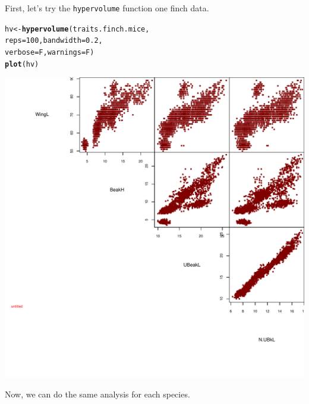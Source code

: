 \documentclass[12pt]{article}\usepackage[]{graphicx}\usepackage[]{color}
\makeatletter
\def\maxwidth{ %
  \ifdim\Gin@nat@width>\linewidth
    \linewidth
  \else
    \Gin@nat@width
  \fi
}
\newcommand{\hlnum}[1]{\textcolor[rgb]{0.686,0.059,0.569}{#1}}%
\newcommand{\hlstd}[1]{\textcolor[rgb]{0.345,0.345,0.345}{#1}}%
\newcommand{\hlkwb}[1]{\textcolor[rgb]{0.69,0.353,0.396}{#1}}%
\newcommand{\hlkwc}[1]{\textcolor[rgb]{0.333,0.667,0.333}{#1}}%
\newcommand{\hlkwd}[1]{\textcolor[rgb]{0.737,0.353,0.396}{\textbf{#1}}}%
\newenvironment{kframe}{%
 \def\at@end@of@kframe{}%
 \ifinner\ifhmode%
  \def\at@end@of@kframe{\end{minipage}}%
  \begin{minipage}{\columnwidth}%
 \fi\fi%
 \def\FrameCommand##1{\hskip\@totalleftmargin \hskip-\fboxsep
 \colorbox{shadecolor}{##1}\hskip-\fboxsep
     \hskip-\linewidth \hskip-\@totalleftmargin \hskip\columnwidth}%
 \MakeFramed {\advance\hsize-\width
   \@totalleftmargin\z@ \linewidth\hsize
   \@setminipage}}%
 {\par\unskip\endMakeFramed%
 \at@end@of@kframe}
\newenvironment{knitrout}{}{} %
\makeatother
\begin{document}
First, let's try the \texttt{hypervolume} function one finch data.
\begin{knitrout}
\color{fgcolor}\begin{kframe}
\begin{alltt}
\hlstd{hv}\hlkwb{<-}\hlkwd{hypervolume}\hlstd{(traits.finch.mice,}
        \hlkwc{reps} \hlstd{=} \hlnum{100}\hlstd{,}\hlkwc{bandwidth} \hlstd{=} \hlnum{0.2}\hlstd{,}
        \hlkwc{verbose} \hlstd{= F,} \hlkwc{warnings} \hlstd{= F)}
\hlkwd{plot}\hlstd{(hv)}
\end{alltt}
\end{kframe}
\includegraphics[width=\maxwidth]{figure/unnamed-chunk-54} 

\end{knitrout}

Now, we can do the same analysis for each species.
\end{document}
